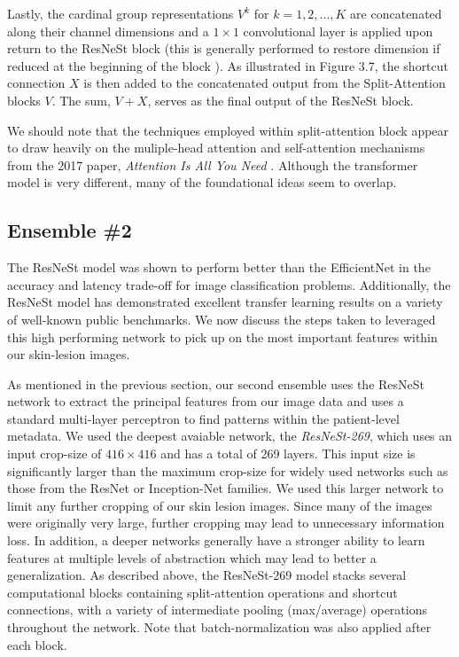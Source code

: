\documentclass [MAS] {uclathes}
\begin{document}
Lastly, the cardinal group representations $V^k$ for $k=1, 2, ..., K$ are concatenated along their channel dimensions and a $1 \times 1$ convolutional layer is applied upon return to the ResNeSt block (this is generally performed to restore dimension if reduced at the beginning of the block \cite{resnet}). As illustrated in Figure 3.7, the shortcut connection $X$ is then added to the concatenated output from the Split-Attention blocks $V$. The sum, $V+X$, serves as the final output of the ResNeSt block.

We should note that the techniques employed within split-attention block appear to draw heavily on the muliple-head attention and self-attention mechanisms from the 2017 paper, \textit{Attention Is All You Need} \cite{attention}. Although the transformer model is very different, many of the foundational ideas seem to overlap.

\subsection{Ensemble \#2}

The ResNeSt model was shown to perform better than the EfficientNet in the accuracy and latency trade-off for image classification problems. Additionally, the ResNeSt model has demonstrated excellent transfer learning results on a variety of well-known public benchmarks. We now discuss the steps taken to leveraged this high performing network to pick up on the most important features within our skin-lesion images.

As mentioned in the previous section, our second ensemble uses the ResNeSt network to extract the principal features from our image data and uses a standard multi-layer perceptron to find patterns within the patient-level metadata. We used the deepest avaiable network, the \textit{ResNeSt-269}, which uses an input crop-size of $416 \times 416$ and has a total of 269 layers. This input size is significantly larger than the maximum crop-size for widely used networks such as those from the ResNet or Inception-Net families. We used this larger network to limit any further cropping of our skin lesion images. Since many of the images were originally very large, further cropping may lead to unnecessary information loss. In addition, a deeper networks generally have a stronger ability to learn features at multiple levels of abstraction which may lead to better a generalization. As described above, the ResNeSt-269 model stacks several computational blocks containing split-attention operations and shortcut connections, with a variety of intermediate pooling (max/average) operations throughout the network. Note that batch-normalization was also applied after each block.
\end{document}
